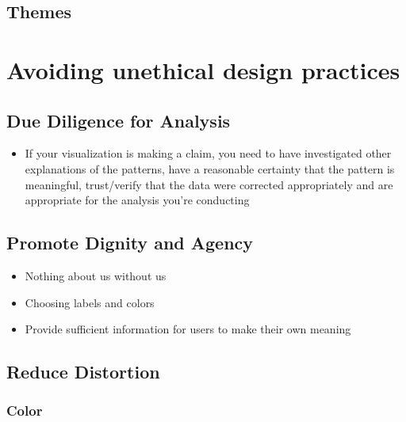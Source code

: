 \documentclass[
]{krantz}
\providecommand{\tightlist}{%
  \setlength{\itemsep}{0pt}\setlength{\parskip}{0pt}}
\begin{document}
\hypertarget{themes}{%
\section{Themes}\label{themes}}

\hypertarget{ethical-design-practices}{%
\chapter{Avoiding unethical design practices}\label{ethical-design-practices}}

\hypertarget{due-diligence-for-analysis}{%
\section{Due Diligence for Analysis}\label{due-diligence-for-analysis}}

\begin{itemize}
\tightlist
\item
  If your visualization is making a claim, you need to have investigated other
  explanations of the patterns, have a reasonable certainty that the pattern is
  meaningful, trust/verify that the data were corrected appropriately and are
  appropriate for the analysis you're conducting
\end{itemize}

\hypertarget{promote-dignity-and-agency}{%
\section{Promote Dignity and Agency}\label{promote-dignity-and-agency}}

\begin{itemize}
\tightlist
\item
  Nothing about us without us
\item
  Choosing labels and colors
\item
  Provide sufficient information for users to make their own meaning
\end{itemize}

\hypertarget{reduce-distortion}{%
\section{Reduce Distortion}\label{reduce-distortion}}

\hypertarget{color}{%
\subsection{Color}\label{color}}
\end{document}
